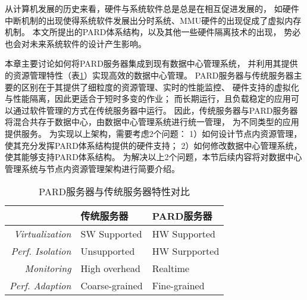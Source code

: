 
从计算机发展的历史来看，硬件与系统软件总是总是在相互促进发展的，
如硬件中断机制的出现使得系统软件发展出分时系统、MMU硬件的出现促成了虚拟内存机制。
本文所提出的PARD体系结构，以及其他一些硬件隔离技术的出现\cite{intel-rdt}，
势必也会对未来系统软件的设计产生影响。

本章主要讨论如何将PARD服务器集成到现有数据中心管理系统，
并利用其提供的资源管理特性（表\ref{tab:pard-features}）实现高效的数据中心管理。
PARD服务器与传统服务器主要的区别在于其提供了细粒度的资源管理、实时的性能监控、
硬件支持的虚拟化与性能隔离，因此更适合于短时多变的作业；
而长期运行，且负载稳定的应用可以通过软件管理的方式在传统服务器中运行。
因此，传统服务器与PARD服务器将混合共存于数据中心，由数据中心管理系统进行统一管理，
为不同类型的应用提供服务。
为实现以上架构，需要考虑2个问题：
1）如何设计节点内资源管理，使其充分发挥PARD体系结构提供的硬件支持；
2）如何修改数据中心管理系统，使其能够支持PARD体系结构。
为解决以上2个问题，本节后续内容将对数据中心管理系统与节点内资源管理架构进行简要介绍。

\begin{table}[hb]
  \centering
  \begin{minipage}[t]{0.7\linewidth}
  \caption{PARD服务器与传统服务器特性对比}
  \label{tab:pard-features}
  \begin{tabular}{rp{}<{\centering}p{}<{\centering}}
    \toprule[1.5pt]
                             & \textbf{传统服务器} & \textbf{PARD服务器} \\
    \midrule[1pt]
      \emph{Virtualization}  & SW Supported        & HW Supported        \\
      \emph{Perf. Isolation} & Unsupported         & HW Surpported       \\
      \emph{Monitoring}      & High overhead       & Realtime            \\
      \emph{Perf. Adaption}  & Coarse-grained      & Fine-grained        \\
    \bottomrule[1.5pt]
  \end{tabular}
  \end{minipage}
\end{table}


